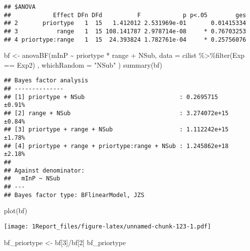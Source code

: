 \documentclass[
]{article}
\newenvironment{Shaded}{\begin{snugshade}}{\end{snugshade}}
\newcommand{\AttributeTok}[1]{\textcolor[rgb]{0.77,0.63,0.00}{#1}}
\newcommand{\DecValTok}[1]{\textcolor[rgb]{0.00,0.00,0.81}{#1}}
\newcommand{\FunctionTok}[1]{\textcolor[rgb]{0.00,0.00,0.00}{#1}}
\newcommand{\NormalTok}[1]{#1}
\newcommand{\OtherTok}[1]{\textcolor[rgb]{0.56,0.35,0.01}{#1}}
\newcommand{\SpecialCharTok}[1]{\textcolor[rgb]{0.00,0.00,0.00}{#1}}
\newcommand{\StringTok}[1]{\textcolor[rgb]{0.31,0.60,0.02}{#1}}
\begin{document}
\begin{verbatim}
## $ANOVA
##            Effect DFn DFd          F            p p<.05        ges
## 2       priortype   1  15   1.412012 2.531969e-01       0.01415334
## 3           range   1  15 108.141787 2.978714e-08     * 0.76703253
## 4 priortype:range   1  15  24.393824 1.782761e-04     * 0.25756076
\end{verbatim}

\begin{Shaded}
\begin{Highlighting}[]
\NormalTok{bf }\OtherTok{\textless{}{-}} \FunctionTok{anovaBF}\NormalTok{(mInP }\SpecialCharTok{\textasciitilde{}}\NormalTok{ priortype }\SpecialCharTok{*}\NormalTok{ range }\SpecialCharTok{+}\NormalTok{ NSub, }\AttributeTok{data =}\NormalTok{ cilist }\SpecialCharTok{\%\textgreater{}\%}\FunctionTok{filter}\NormalTok{(Exp }\SpecialCharTok{==} \StringTok{\textquotesingle{}Exp2\textquotesingle{}}\NormalTok{) , }\AttributeTok{whichRandom =} \StringTok{"NSub"}\NormalTok{ ) }
\FunctionTok{summary}\NormalTok{(bf)}
\end{Highlighting}
\end{Shaded}

\begin{verbatim}
## Bayes factor analysis
## --------------
## [1] priortype + NSub                           : 0.2695715    ±0.91%
## [2] range + NSub                               : 3.274072e+15 ±0.84%
## [3] priortype + range + NSub                   : 1.112242e+15 ±1.78%
## [4] priortype + range + priortype:range + NSub : 1.245862e+18 ±2.18%
## 
## Against denominator:
##   mInP ~ NSub 
## ---
## Bayes factor type: BFlinearModel, JZS
\end{verbatim}

\begin{Shaded}
\begin{Highlighting}[]
\FunctionTok{plot}\NormalTok{(bf)}
\end{Highlighting}
\end{Shaded}

\texttt{[image: 1Report\_files/figure-latex/unnamed-chunk-123-1.pdf]}

\begin{Shaded}
\begin{Highlighting}[]
\NormalTok{ bf\_priortype }\OtherTok{\textless{}{-}}\NormalTok{ bf[}\DecValTok{3}\NormalTok{]}\SpecialCharTok{/}\NormalTok{bf[}\DecValTok{2}\NormalTok{]}
\NormalTok{ bf\_priortype}
\end{Highlighting}
\end{Shaded}
\end{document}
